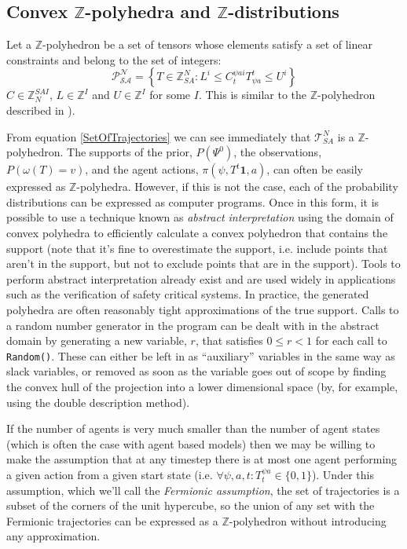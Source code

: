 \documentclass{article}
\begin{document}
\subsection{Convex $\mathbb{Z}$-polyhedra and $\mathbb{Z}$-distributions}
\label{BPoly}

Let a $\mathbb{Z}$-polyhedron be a set of tensors whose elements satisfy a set of linear constraints and belong to the set of integers: 
\[
\mathcal{P^N_{SA}} = \left\{ T\in\mathbb{\mathbb{Z}}^N_{SA} : L^{i} \le  C^{\psi ai}_t T^t_{\psi a} \le U^{i} \right\}
\]
$C \in \mathbb{Z}^{SAI}_{N}$, $L \in \mathbb{Z}^I$ and $U \in \mathbb{Z}^I$ for some $I$. This is similar to the $\mathbb{Z}$-polyhedron described in \cite{quinton1996manipulating}).

From equation \ref{SetOfTrajectories} we can see immediately that $\mathcal{T}^N_{SA}$ is a  $\mathbb{Z}$-polyhedron. The supports of the prior, $P(\Psi^0)$, the observations, $P(\omega(T)=v)$, and the agent actions, $\pi(\psi,T^t\mathbf{1},a)$, can often be easily expressed as $\mathbb{Z}$-polyhedra. However, if this is not the case, each of the probability distributions can be expressed as computer programs. Once in this form, it is possible to use a technique known as \textit{abstract interpretation}\cite{cousot1977abstract} using the domain of convex polyhedra\cite{cousot1978automatic}\cite{becchi2018efficient}\cite{fukuda2020polyhedral} to efficiently calculate a convex polyhedron that contains the support (note that it's fine to overestimate the support, i.e. include points that aren't in the support, but not to exclude points that are in the support). Tools to perform abstract interpretation already exist\cite{henry2012pagai}\cite{GN2021} and are used widely in applications such as the verification of safety critical systems\cite{blanchet2003static}. In practice, the generated polyhedra are often reasonably tight approximations of the true support. Calls to a random number generator in the program can be dealt with in the abstract domain by generating a new variable, $r$, that satisfies $0 \le r < 1$ for each call to \texttt{Random()}. These can either be left in as ``auxiliary'' variables in the same way as slack variables, or removed as soon as the variable goes out of scope by finding the convex hull of the projection into a lower dimensional space (by, for example, using the double description method\cite{motzkin1953double}).

If the number of agents is very much smaller than the number of agent states (which is often the case with agent based models) then we may be willing to make the assumption that at any timestep there is at most one agent performing a given action from a given start state (i.e. $\forall \psi, a, t: T^{\psi a}_t \in \{0,1\}$). Under this assumption, which we'll call the \textit{Fermionic assumption}, the set of trajectories is a subset of the corners of the unit hypercube, so the union of any set with the Fermionic trajectories can be expressed as a $\mathbb{Z}$-polyhedron without introducing any approximation.
\end{document}
